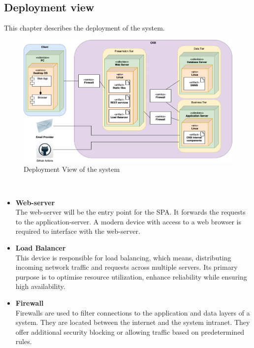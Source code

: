 \vspace{1cm}

\subsection{Deployment view}
This chapter describes the deployment of the system.
\begin{figure}[h]
    \centering
    \includegraphics[width=1\linewidth]{src/Deployment View of the system.png}
    \caption{Deployment View of the system}
    \label{fig:Deployment View of the system}
\end{figure}
\\
\begin{itemize}
    \item \textbf{Web-server}\\
    The web-server will be the entry point for the SPA. It forwards the requests to the application-server. A modern device with access to a web browser is required to interface with the web-server. 
    \item \textbf{Load Balancer}\\
    This device is responsible for load balancing, which means, distributing incoming network traffic and requests across multiple servers. Its primary purpose is to optimise resource utilization, enhance reliability while ensuring high availability.
    \item \textbf{Firewall}\\
    Firewalls are used to filter connections to the application and data layers of a system. They are located between the internet and the system intranet. They offer additional security blocking or allowing traffic based on predetermined rules.
\end{itemize}

